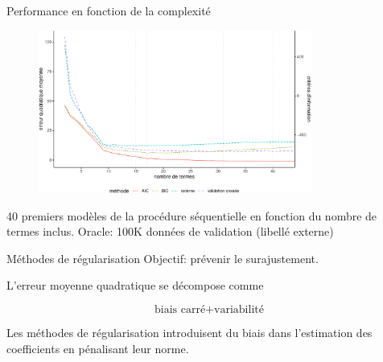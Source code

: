 \documentclass[
  ignorenonframetext,
]{beamer}
\begin{document}
\begin{frame}{Performance en fonction de la complexité}
\protect\hypertarget{performance-en-fonction-de-la-complexituxe9}{}
\begin{figure}

{\centering \includegraphics[width=0.8\textwidth,height=\textheight]{figures/fig-perfo-sequentiel.pdf}

}

\end{figure}

\footnotesize

40 premiers modèles de la procédure séquentielle en fonction du nombre
de termes inclus. Oracle: 100K données de validation (libellé externe)

\normalsize
\end{frame}

\begin{frame}{Méthodes de régularisation}
\protect\hypertarget{muxe9thodes-de-ruxe9gularisation}{}
Objectif: prévenir le surajustement.

L'erreur moyenne quadratique se décompose comme

\[ \text{biais carré} + \text{variabilité}\]

Les méthodes de régularisation introduisent du biais dans l'estimation
des coefficients en pénalisant leur norme.
\end{frame}
\end{document}
